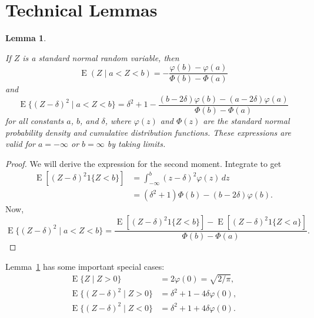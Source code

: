 \documentclass[12pt]{article}
\newtheorem{lemma}{Lemma}
\newcommand{\E}{\operatorname{E}}
\begin{document}
\section{Technical Lemmas}
\label{app:technical-lemmas}

\begin{lemma}\label{lem:truncated-normal-moments}

If $Z$ is a standard normal random variable, then
\[
  \E(Z \mid a < Z < b)
    = - \frac{\varphi(b) - \varphi(a)}
             {\Phi(b) - \Phi(a)}
\]
and
\[
  \E\{(Z - \delta)^2 \mid a < Z < b\}
    = \delta^2 + 1
    - \frac{  (b - 2 \delta) \varphi(b)
            - (a - 2 \delta) \varphi(a)}
           {\Phi(b) - \Phi(a)}
\]
for all constants $a$, $b$, and $\delta$, where $\varphi(z)$ and $\Phi(z)$ are
the standard normal probability density and cumulative distribution functions.
These expressions are valid for $a = -\infty$ or $b = \infty$ by taking
limits.

\end{lemma}
\begin{proof}
We will derive the expression for the second moment.  Integrate to get
\begin{align*}
  \E[ (Z - \delta)^2 1\{Z < b\}]
    &= \int_{-\infty}^b (z - \delta)^2 \varphi(z) \, dz \\
    &= (\delta^2 + 1) \Phi(b) - (b - 2 \delta) \varphi(b).
\end{align*}
Now,
\[
  \E\{(Z - \delta)^2 \mid a < Z < b\}
    =
    \frac{  \E[ (Z - \delta)^2 1\{Z < b\}]
          - \E[ (Z - \delta)^2 1\{Z < a\}]}
         { \Phi(b) - \Phi(a) }.
\]
\end{proof}

Lemma~\ref{lem:truncated-normal-moments} has some important special cases:
\begin{align*}
  \E\{Z \mid Z > 0\} &= 2 \varphi(0) = \sqrt{2 / \pi}, \\
  \E\{(Z - \delta)^2 \mid Z > 0 \}
    &= \delta^2 + 1 - 4 \delta \varphi(0), \\
  \E\{(Z - \delta)^2 \mid Z < 0 \}
    &= \delta^2 + 1 + 4 \delta \varphi(0).
\end{align*}
\clearpage



\end{document}
